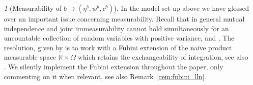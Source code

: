 \documentclass[11pt,oneside,english,reqno,dvipsnames,table]{amsart}
\numberwithin{equation}{section}
\theoremstyle{plain}
\theoremstyle{definition}
\theoremstyle{remark}
\newtheorem{rem}[thm]{\protect\remarkname}
\theoremstyle{plain}
\theoremstyle{plain}
\theoremstyle{plain}
\theoremstyle{plain}
\theoremstyle{plain}
\theoremstyle{plain}
\theoremstyle{plain}
\providecommand{\remarkname}{Remark}
\providecommand{\remarkname}{Remark}
\newcommand{\mbR}{\mathbb{R}}
\numberwithin{thm}{section}
\begin{document}
\begin{rem}[Measurability of $b\mapsto (\eta^b,w^b,c^b)$]\label{rem:fubini_measurability}
%
 In the model set-up above we have glossed over an important issue concerning measurability. Recall that in general mutual independence and joint immeasurability cannot hold simultaneously for an uncountable collection of random variables with positive variance, \cite[Thm.~2.2]{doob_37_continuous} \cite{judd_85_continuum} and \cite[Prop.~2.1]{sun_06_exact}. The resolution, given by \cite[Thm~2.8]{sun_06_exact} is to work with a Fubini extension of the naive product measurable space $\mbR \times \Omega$ which retains the exchangeability of integration, see also \cite{podczeck_10_fubini}. We silently implement the Fubini extension throughout the paper, only commenting on it when relevant, see also Remark~\ref{rem:fubini_lln}. 
%
% 
\end{rem}
\end{document}
